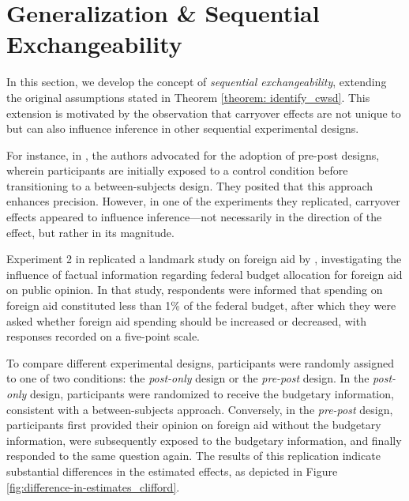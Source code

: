 \section{Generalization \& Sequential Exchangeability}
\label{sec: seq_exchangeability_alt_design}

In this section, we develop the concept of \emph{sequential exchangeability}, extending the original assumptions stated in Theorem \ref{theorem: identify_cwsd}. This extension is motivated by the observation that carryover effects are not unique to \cwsd{} but can also influence inference in other sequential experimental designs.

For instance, in \cite{09_Clifford}, the authors advocated for the adoption of pre-post designs, wherein participants are initially exposed to a control condition before transitioning to a between-subjects design. They posited that this approach enhances precision. However, in one of the experiments they replicated, carryover effects appeared to influence inference—not necessarily in the direction of the effect, but rather in its magnitude.

Experiment 2 in \cite{09_Clifford} replicated a landmark study on foreign aid by \citep{GilensMartin2001PIaC}, investigating the influence of factual information regarding federal budget allocation for foreign aid on public opinion. In that study, respondents were informed that spending on foreign aid constituted less than 1\% of the federal budget, after which they were asked whether foreign aid spending should be increased or decreased, with responses recorded on a five-point scale.

To compare different experimental designs, participants were randomly assigned to one of two conditions: the \textit{post-only} design or the \textit{pre-post} design. In the \textit{post-only} design, participants were randomized to receive the budgetary information, consistent with a between-subjects approach. Conversely, in the \textit{pre-post} design, participants first provided their opinion on foreign aid without the budgetary information, were subsequently exposed to the budgetary information, and finally responded to the same question again. The results of this replication indicate substantial differences in the estimated effects, as depicted in Figure \ref{fig:difference-in-estimates_clifford}.

